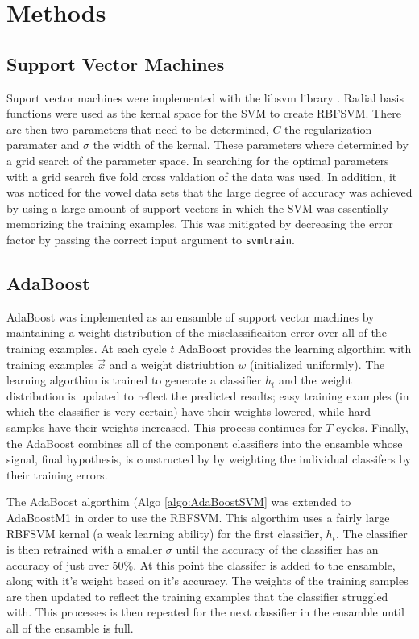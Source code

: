 \section{Methods}
\label{sec:Methods}

\subsection{Support Vector Machines}

Suport vector machines were implemented with the libsvm library \cite{chang_libsvm:_2011}.
Radial basis functions were used as the kernal space for the SVM to create RBFSVM.
There are then two parameters that need to be determined, $C$ the regularization paramater and $\sigma$ the width of the kernal.
These parameters where determined by a grid search of the parameter space.
In searching for the optimal parameters with a grid search five fold cross valdation of the data was used.
In addition, it was noticed for the vowel data sets that the large degree of accuracy was achieved by using a large amount of support vectors in which the SVM was essentially memorizing the training examples.
This was mitigated by decreasing the error factor by passing the correct input argument to \verb+svmtrain+.

\subsection{AdaBoost}

AdaBoost was implemented as an ensamble of support vector machines by maintaining a weight distribution of the misclassificaiton error over all of the training examples.
At each cycle $t$ AdaBoost provides the learning algorthim with training examples $\vec{x}$ and a weight distriubtion $w$ (initialized uniformly).
The learning algorthim is trained to generate a classifier $h_t$ and the weight distribution is updated to reflect the predicted results; easy training examples (in which the classifier is very certain) have their weights lowered, while hard samples have their weights increased.
This process continues for $T$ cycles.
Finally, the AdaBoost combines all of the component classifiers into the ensamble whose signal, final hypothesis, is constructed by by weighting the individual classifers by their training errors.

The AdaBoost algorthim (Algo \ref{algo:AdaBoostSVM} was extended to AdaBoostM1 in order to use the RBFSVM.
This algorthim uses a fairly large RBFSVM kernal (a weak learning ability) for the first classifier, $h_t$.
The classifier is then retrained with a smaller $\sigma$ until the accuracy of the classifier has an accuracy of just over 50\%.
At this point the classifer is added to the ensamble, along with it's weight based on it's accuracy.
The weights of the training samples are then updated to reflect the training examples that the classifier struggled with.
This processes is then repeated for the next classifier in the ensamble until all of the ensamble is full.

